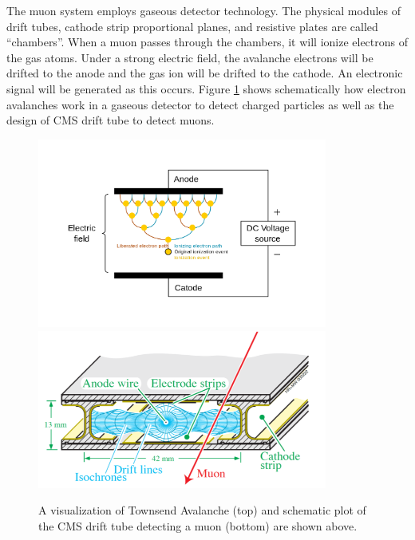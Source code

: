 
The muon system employs gaseous detector technology. The physical modules of drift tubes, cathode strip proportional planes, and resistive plates are called ``chambers''. When a muon passes through the chambers, it will ionize electrons of the gas atoms. Under a strong electric field, the avalanche electrons will be drifted to the anode and the gas ion will be drifted to the cathode. An electronic signal will be generated as this occurs. Figure \ref{Muonsystem} shows schematically how electron avalanches work in a gaseous detector to detect charged particles as well as the design of CMS drift tube to detect muons.


\begin{figure}[hbtp]
\begin{center}
\includegraphics[width=0.85\textwidth]{Figures/Chapter3/EAva.png}
\includegraphics[width=0.85\textwidth]{Figures/Chapter3/CMSDT.png}
\caption{A visualization of Townsend Avalanche (top) and schematic plot of the CMS drift tube detecting a muon (bottom) are shown above.}
\label{Muonsystem}
\end{center}
\end{figure} 


